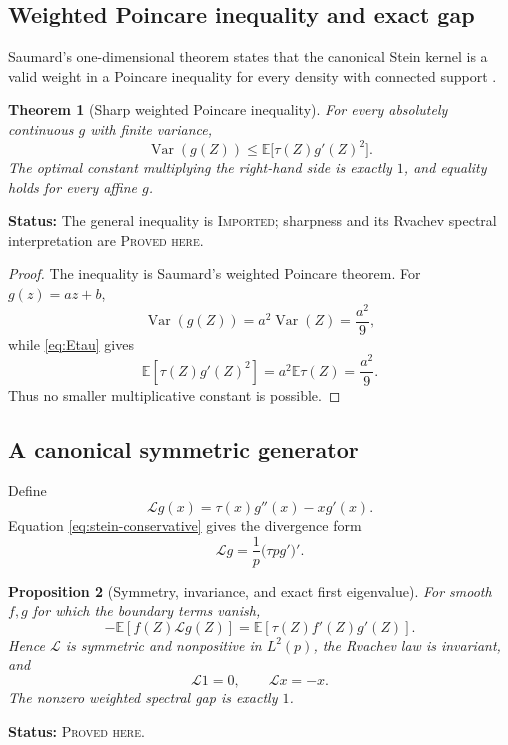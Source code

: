 \documentclass[11pt,oneside]{article}
\newtheorem{theorem}{Theorem}[section]
\newtheorem{proposition}[theorem]{Proposition}
\theoremstyle{definition}
\theoremstyle{remark}
\newcommand{\Var}{\operatorname{Var}}
\newcommand{\E}{\mathbb E}
\newcommand{\Imported}{\textcolor{linkblue}{\textsc{Imported}}}
\newcommand{\ProvedHere}{\textcolor{statusgreen}{\textsc{Proved here}}}
\newcommand{\Status}[1]{\par\smallskip\noindent\textbf{Status:} #1.\par\smallskip}
\begin{document}
\subsection{Weighted Poincare inequality and exact gap}
Saumard's one-dimensional theorem states that the canonical Stein kernel is a
valid weight in a Poincare inequality for every density with connected support
\cite{saumard}.

\begin{theorem}[Sharp weighted Poincare inequality]\label{thm:poincare}
For every absolutely continuous $g$ with finite variance,
\begin{equation}\label{eq:weighted-poincare}
 \Var(g(Z))\le \E\bigl[\tau(Z)g'(Z)^2\bigr].
\end{equation}
The optimal constant multiplying the right-hand side is exactly $1$, and equality
holds for every affine $g$.
\end{theorem}
\Status{The general inequality is \Imported; sharpness and its Rvachev spectral
interpretation are \ProvedHere}

\begin{proof}
The inequality is Saumard's weighted Poincare theorem.  For $g(z)=az+b$,
\[
 \Var(g(Z))=a^2\Var(Z)=\frac{a^2}{9},
\]
while \eqref{eq:Etau} gives
\[
 \E[\tau(Z)g'(Z)^2]=a^2\E\tau(Z)=\frac{a^2}{9}.
\]
Thus no smaller multiplicative constant is possible.
\end{proof}

\subsection{A canonical symmetric generator}
Define
\begin{equation}\label{eq:generator}
 \mathcal Lg(x)=\tau(x)g''(x)-xg'(x).
\end{equation}
Equation \eqref{eq:stein-conservative} gives the divergence form
\begin{equation}\label{eq:generator-divergence}
 \mathcal Lg=\frac1p\bigl(\tau p g'\bigr)'.
\end{equation}

\begin{proposition}[Symmetry, invariance, and exact first eigenvalue]
\label{prop:generator}
For smooth $f,g$ for which the boundary terms vanish,
\begin{equation}\label{eq:dirichlet}
 -\E[f(Z)\mathcal Lg(Z)]
 =\E[\tau(Z)f'(Z)g'(Z)].
\end{equation}
Hence $\mathcal L$ is symmetric and nonpositive in $L^2(p)$, the Rvachev law is
invariant, and
\begin{equation}\label{eq:first-eigen}
 \mathcal L1=0,
 \qquad \mathcal Lx=-x.
\end{equation}
The nonzero weighted spectral gap is exactly $1$.
\end{proposition}
\Status{\ProvedHere}
\end{document}
